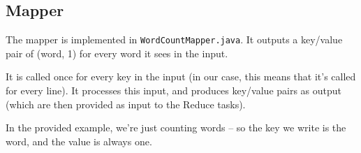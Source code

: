 \documentclass[a4paper,11pt]{article}
\begin{document}
  

 
  
  
    
  \subsection{Mapper}
 
  The mapper is implemented in \texttt{WordCountMapper.java}. It outputs a key/value pair of (word, 1) for every word it sees in the input.

  It is called once for every key in the input (in our case, this means that it's called for every line). It processes this input,
  and produces key/value pairs as output (which are then provided as input to the Reduce tasks).

  In the provided example, we're just counting words -- so the key we write is the word, and the value is always one.

  
\end{document}
